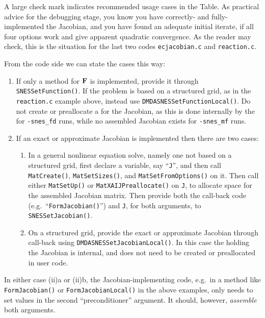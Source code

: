 A large check mark indicates recommended usage cases in the Table.  As practical advice for the debugging stage, you know you have correctly- and fully-implemented the Jacobian, and you have found an adequate initial iterate, if all four options work and give apparent quadratic convergence.  As the reader may check, this is the situation for the last two codes \texttt{ecjacobian.c} and \texttt{reaction.c}.

From the code side we can state the cases this way:
\renewcommand{\labelenumi}{(\roman{enumi})}
\begin{enumerate}
\item If only a method for $\mathbf{F}$ is implemented, provide it through \texttt{SNESSetFunction()}.  If the problem is based on a structured grid, as in the \texttt{reaction.c} example above, instead use \texttt{DMDASNESSetFunctionLocal()}.  Do not create or preallocate a \pMat for the Jacobian, as this is done internally by the \pSNES for \texttt{-snes\_fd} runs, while no assembled Jacobian \pMat exists for \texttt{-snes\_mf} runs.
\item If an exact or approximate Jacobian is implemented then there are two cases:
   \renewcommand{\labelenumii}{\alph{enumii}.}
   \begin{enumerate}
   \item In a general nonlinear equation solve, namely one not based on a structured grid, first declare a \pMat variable, say ``\texttt{J}'', and then call \texttt{MatCreate()}, \texttt{MatSetSizes()}, and \texttt{MatSetFromOptions()} on it.  Then call either \texttt{MatSetUp()} or \texttt{MatXAIJPreallocate()} on \texttt{J}, to allocate space for the assembled Jacobian matrix.  Then provide both the call-back code (e.g.~``\texttt{FormJacobian()}'') and \texttt{J}, for both \pMat arguments, to \texttt{SNESSetJacobian()}.
   \item On a structured grid, provide the exact or approximate Jacobian through call-back using \texttt{DMDASNESSetJacobianLocal()}.  In this case the \pMat holding the Jacobian is internal, and does not need to be created or preallocated in user code.
   \end{enumerate}
\end{enumerate}
In either case (ii)a or (ii)b, the Jacobian-implementing code, e.g.~in a method like \texttt{FormJacobian()} or \texttt{FormJacobianLocal()} in the above examples, only needs to set values in the second ``preconditioner'' \pMat argument.  It should, however, \emph{assemble} both \pMat arguments.

